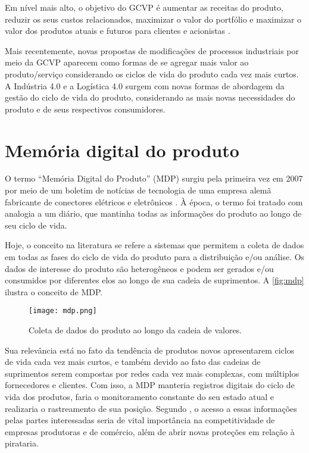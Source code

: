 Em nível mais alto, o objetivo do GCVP é aumentar as receitas do produto, reduzir os seus custos relacionados, maximizar o valor do portfólio e maximizar o valor dos produtos atuais e futuros para clientes e acionistas \cite{stark2015lifecycle}.

Mais recentemente, novas propostas de modificações de processos industriais por meio da GCVP aparecem como formas de se agregar mais valor ao produto/serviço considerando os ciclos de vida do produto cada vez mais curtos. A Indústria 4.0 e a Logística 4.0 surgem com novas formas de abordagem da gestão do ciclo de vida do produto, considerando as mais novas necessidades do produto e de seus respectivos consumidores.

\section{Memória digital do produto}
\label{sec:mdp}

O termo ``Memória Digital do Produto'' (MDP) surgiu pela primeira vez em 2007 por meio de um boletim de notícias de tecnologia de uma empresa alemã fabricante de conectores elétricos e eletrônicos \cite{wahlster2007digitalmemory}. À época, o termo foi tratado com analogia a um diário, que mantinha todas as informações do produto ao longo de seu ciclo de vida.

Hoje, o conceito na literatura se refere a sistemas que permitem a coleta de dados em todas as fases do ciclo de vida do produto para a distribuição e/ou análise. Os dados de interesse do produto são heterogêneos e podem ser gerados e/ou consumidos por diferentes elos ao longo de sua cadeia de suprimentos. A \autoref{fig:mdp} ilustra o conceito de MDP.

\begin{figure}[htb]
	\centering
	\texttt{[image: mdp.png]}
	\caption{Coleta de dados do produto ao longo da cadeia de valores.}
	\label{fig:mdp}
\end{figure}

Sua relevância está no fato da tendência de produtos novos apresentarem ciclos de vida cada vez mais curtos, e também devido ao fato das cadeias de suprimentos serem compostas por redes cada vez mais complexas, com múltiplos fornecedores e clientes. Com isso, a MDP manteria registros digitais do ciclo de vida dos produtos, faria o monitoramento constante do seu estado atual e realizaria o rastreamento de sua posição. Segundo , o acesso a essas informações pelas partes interessadas seria de vital importância na competitividade de empresas produtoras e de comércio, além de abrir novas proteções em relação à pirataria.


